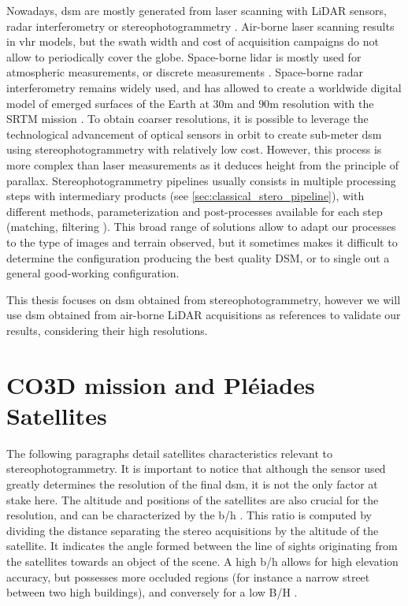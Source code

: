 Nowadays, \acrshort{dsm} are mostly generated from laser scanning with LiDAR sensors, radar interferometry or stereophotogrammetry \cite{youssefi_cars_2020}. Air-borne laser scanning results in \acrfull{vhr} models, but the swath width and cost of acquisition campaigns do not allow to periodically cover the globe. Space-borne \acrshort{lidar} is mostly used for atmospheric measurements, or discrete measurements \cite{fouladinejad_history_2019} . Space-borne radar interferometry remains widely used, and has allowed to create a worldwide digital model of emerged surfaces of the Earth at $30$m and $90$m resolution with the SRTM mission \cite{farr_shuttle_2007}. To obtain coarser resolutions, it is possible to leverage the technological advancement of optical sensors in orbit to create sub-meter \acrshort{dsm} using stereophotogrammetry with relatively low cost. However, this process is more complex than laser measurements as it deduces height from the principle of parallax. Stereophotogrammetry pipelines usually consists in multiple processing steps with intermediary products (see \ref{sec:classical_stero_pipeline}), with different methods, parameterization and post-processes available for each step (\eg matching, filtering \etc). This broad range of solutions allow to adapt our processes to the type of images and terrain observed, but it sometimes makes it difficult to determine the configuration producing the best quality DSM, or to single out a general good-working configuration. 

This thesis focuses on \acrshort{dsm} obtained from stereophotogrammetry, however we will use \acrshort{dsm} obtained from air-borne LiDAR acquisitions as references to validate our results, considering their high resolutions.

\section{CO3D mission and Pléiades Satellites}
The following paragraphs detail satellites characteristics relevant to stereophotogrammetry. It is important to notice that although the sensor used greatly determines the resolution of the final \acrshort{dsm}, it is not the only factor at stake here. The altitude and positions of the satellites are also crucial for the resolution, and can be characterized by the \acrfull{b/h} . This ratio is computed by dividing the distance separating the stereo acquisitions by the altitude of the satellite. It indicates the angle formed between the line of sights originating from the satellites towards an object of the scene. A high \acrshort{b/h} allows for high elevation accuracy, but possesses more occluded regions (for instance a narrow street between two high buildings), and conversely for a low B/H \cite{delon_small_2007}.

